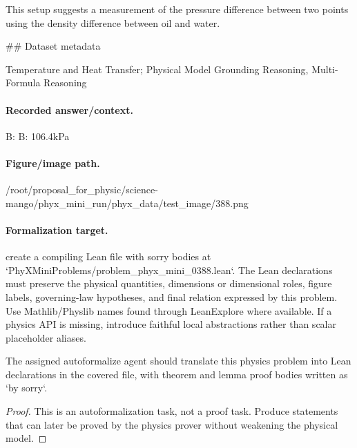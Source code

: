 This setup suggests a measurement of the pressure difference between two points using the density difference between oil and water.

\#\# Dataset metadata

Temperature and Heat Transfer; Physical Model Grounding Reasoning, Multi-Formula Reasoning

\paragraph{Recorded answer/context.}
B: B: 106.4kPa

\paragraph{Figure/image path.}
/root/proposal\_for\_physic/science-mango/phyx\_mini\_run/phyx\_data/test\_image/388.png

\paragraph{Formalization target.}
create a compiling Lean file with sorry bodies at `PhyXMiniProblems/problem\_phyx\_mini\_0388.lean`. The Lean declarations must preserve the physical quantities, dimensions or dimensional roles, figure labels, governing-law hypotheses, and final relation expressed by this problem.
Use Mathlib/Physlib names found through LeanExplore where available. If a physics API is missing, introduce faithful local abstractions rather than scalar placeholder aliases.

\begin{theorem}
\label{thm:physics:phyx_mini_0388:target}
The assigned autoformalize agent should translate this physics problem into Lean declarations in the covered file, with theorem and lemma proof bodies written as `by sorry`.
\end{theorem}
\begin{proof}
This is an autoformalization task, not a proof task. Produce statements that can later be proved by the physics prover without weakening the physical model.
\end{proof}

